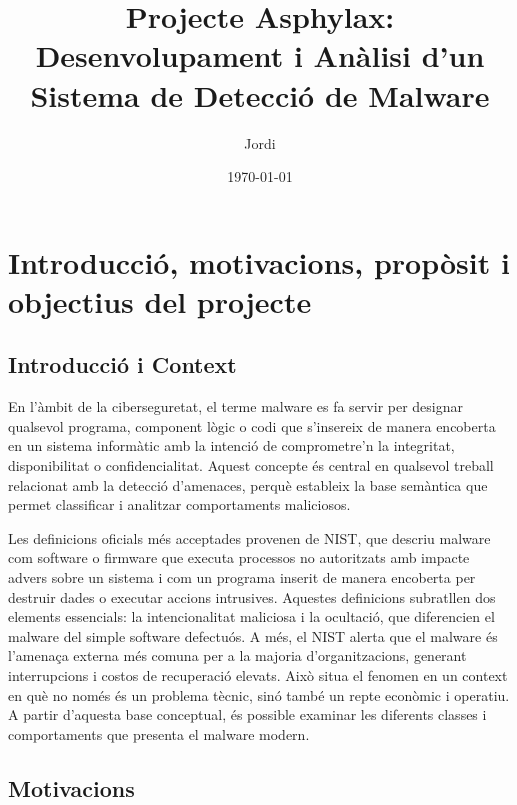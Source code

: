 \documentclass[12pt,a4paper]{report}
\title{Projecte Asphylax: Desenvolupament i Anàlisi d'un Sistema de Detecció de Malware}
\author{Jordi}
\date{\today}
\begin{document}
\maketitle

\tableofcontents
\listoftables
\listoffigures

\chapter{Introducció, motivacions, propòsit i objectius del projecte}
\label{ch:introduccio}

\section{Introducció i Context}
En l'àmbit de la ciberseguretat, el terme malware es fa servir per designar qualsevol programa, component lògic o codi que s'insereix de manera encoberta en un sistema informàtic amb la intenció de comprometre'n la integritat, disponibilitat o confidencialitat. Aquest concepte és central en qualsevol treball relacionat amb la detecció d'amenaces, perquè estableix la base semàntica que permet classificar i analitzar comportaments maliciosos.

Les definicions oficials més acceptades provenen de NIST, que descriu malware com software o firmware que executa processos no autoritzats amb impacte advers sobre un sistema i com un programa inserit de manera encoberta per destruir dades o executar accions intrusives. Aquestes definicions subratllen dos elements essencials: la intencionalitat maliciosa i la ocultació, que diferencien el malware del simple software defectuós. A més, el NIST alerta que el malware és l'amenaça externa més comuna per a la majoria d'organitzacions, generant interrupcions i costos de recuperació elevats. Això situa el fenomen en un context en què no només és un problema tècnic, sinó també un repte econòmic i operatiu. A partir d'aquesta base conceptual, és possible examinar les diferents classes i comportaments que presenta el malware modern.

\section{Motivacions}
\end{document}
